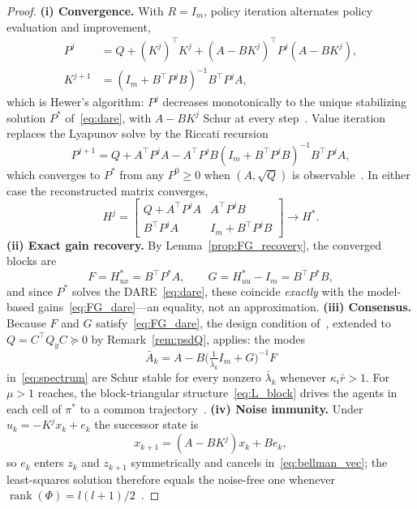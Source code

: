 \documentclass[12pt]{elsarticle}
\theoremstyle{remark}
\DeclareMathOperator{\rank}{rank}
\begin{document}
\begin{proof}
\textbf{(i) Convergence.} With $R = I_m$, policy iteration alternates policy evaluation and improvement,
\begin{align*}
P^j &= Q + (K^j)^\top K^j + (A - BK^j)^\top P^j (A - BK^j),\\
K^{j+1} &= (I_m + B^\top P^j B)^{-1} B^\top P^j A,
\end{align*}
which is Hewer's algorithm: $P^j$ decreases monotonically to the unique stabilizing solution $P^*$ of~\eqref{eq:dare}, with $A-BK^j$ Schur at every step~\cite{hewer1971}. Value iteration replaces the Lyapunov solve by the Riccati recursion
\begin{equation*}
P^{j+1} = Q + A^\top P^j A - A^\top P^j B (I_m + B^\top P^j B)^{-1} B^\top P^j A,
\end{equation*}
which converges to $P^*$ from any $P^0 \geq 0$ when $(A, \sqrt{Q})$ is observable~\cite{lewis2009,rizvi2022}. In either case the reconstructed matrix converges,
\begin{equation*}
H^j = \begin{bmatrix} Q+A^\top P^j A & A^\top P^j B\\[1pt] B^\top P^j A & I_m + B^\top P^j B\end{bmatrix} \longrightarrow H^*.
\end{equation*}
\textbf{(ii) Exact gain recovery.} By Lemma~\ref{prop:FG_recovery}, the converged blocks are
\begin{equation*}
F = H_{ux}^* = B^\top P^* A, \qquad G = H_{uu}^* - I_m = B^\top P^* B,
\end{equation*}
and since $P^*$ solves the DARE~\eqref{eq:dare}, these coincide \emph{exactly} with the model-based gains~\eqref{eq:FG_dare}---an equality, not an approximation.
\textbf{(iii) Consensus.} Because $F$ and $G$ satisfy~\eqref{eq:FG_dare}, the design condition of~\cite[Thm.~3.1]{cacace2024}, extended to $Q = C^\top Q_y C \succeq 0$ by Remark~\ref{rem:psdQ}, applies: the modes
\begin{equation*}
\bar{A}_k = A - B\Big(\tfrac{1}{\bar{\lambda}_k} I_m + G\Big)^{-1} F
\end{equation*}
in~\eqref{eq:spectrum} are Schur stable for every nonzero $\bar{\lambda}_k$ whenever $\kappa_i \bar{r} > 1$. For $\mu > 1$ reaches, the block-triangular structure~\eqref{eq:L_block} drives the agents in each cell of $\pi^*$ to a common trajectory~\cite[Thm.~4.1]{cacace2024}.
\textbf{(iv) Noise immunity.} Under $u_k = -K^j x_k + e_k$ the successor state is
\begin{equation*}
x_{k+1} = (A - BK^j)x_k + B e_k,
\end{equation*}
so $e_k$ enters $z_k$ and $z_{k+1}$ symmetrically and cancels in~\eqref{eq:bellman_vec}; the least-squares solution therefore equals the noise-free one whenever $\rank(\Phi) = l(l+1)/2$~\cite{bradtke1994,rizvi2022}.
\end{proof}
\end{document}
